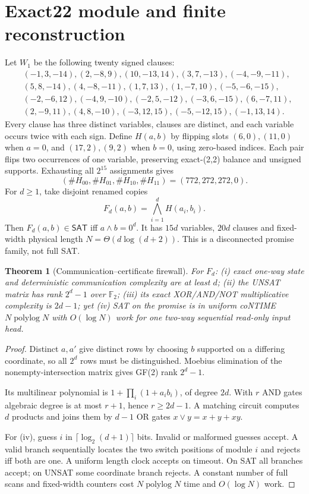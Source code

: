 \documentclass[11pt]{article}
\newtheorem{theorem}{Theorem}
\newcommand{\SAT}{\mathsf{SAT}}
\begin{document}
\section{Exact22 module and finite reconstruction}
Let \(W_1\) be the following twenty signed clauses:
\begin{align*}
&(-1,3,-14),(2,-8,9),(10,-13,14),(3,7,-13),(-4,-9,-11),\\
&(5,8,-14),(4,-8,-11),(1,7,13),(1,-7,10),(-5,-6,-15),\\
&(-2,-6,12),(-4,9,-10),(-2,5,-12),(-3,6,-15),(6,-7,11),\\
&(2,-9,11),(4,8,-10),(-3,12,15),(-5,-12,15),(-1,13,14).
\end{align*}
Every clause has three distinct variables, clauses are distinct, and each variable occurs twice with each sign. Define \(H(a,b)\) by flipping slots \((6,0),(11,0)\) when \(a=0\), and \((17,2),(9,2)\) when \(b=0\), using zero-based indices. Each pair flips two occurrences of one variable, preserving exact-(2,2) balance and unsigned supports. Exhausting all \(2^{15}\) assignments gives
\[
(\#H_{00},\#H_{01},\#H_{10},\#H_{11})=(772,272,272,0). \tag{1}
\]
For \(d\ge1\), take disjoint renamed copies
\[
F_d(a,b)=\bigwedge_{i=1}^dH(a_i,b_i).
\]
Then \(F_d(a,b)\in\SAT\) iff \(a\wedge b=0^d\). It has \(15d\) variables, \(20d\) clauses and fixed-width physical length \(N=\Theta(d\log(d+2))\). This is a disconnected promise family, not full SAT.

\begin{theorem}[Communication--certificate firewall]\label{th:firewall}
For \(F_d\): (i) exact one-way state and deterministic communication complexity are at least \(d\); (ii) the UNSAT matrix has rank \(2^d-1\) over \(\mathbb F_2\); (iii) its exact XOR/AND/NOT multiplicative complexity is \(2d-1\); yet (iv) SAT on the promise is in uniform coNTIME \(N\operatorname{polylog}N\) with \(O(\log N)\) work for one two-way sequential read-only input head.
\end{theorem}
\begin{proof}
Distinct \(a,a'\) give distinct rows by choosing \(b\) supported on a differing coordinate, so all \(2^d\) rows must be distinguished. Moebius elimination of the nonempty-intersection matrix gives GF(2) rank \(2^d-1\).

Its multilinear polynomial is \(1+\prod_i(1+a_ib_i)\), of degree \(2d\). With \(r\) AND gates algebraic degree is at most \(r+1\), hence \(r\ge2d-1\). A matching circuit computes \(d\) products and joins them by \(d-1\) OR gates \(x\vee y=x+y+xy\).

For (iv), guess \(i\) in \(\lceil\log_2(d+1)\rceil\) bits. Invalid or malformed guesses accept. A valid branch sequentially locates the two switch positions of module \(i\) and rejects iff both are one. A uniform length clock accepts on timeout. On SAT all branches accept; on UNSAT some coordinate branch rejects. A constant number of full scans and fixed-width counters cost \(N\operatorname{polylog}N\) time and \(O(\log N)\) work.
\end{proof}
\end{document}
